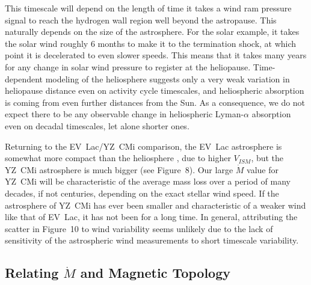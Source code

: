 \documentclass[preprint]{aastex}
\begin{document}
     This timescale will depend on
the length of time it takes a wind ram pressure signal to reach the
hydrogen wall region well beyond the astropause.  This naturally
depends on the size of the astrosphere.  For the solar example,
it takes the solar wind roughly 6 months to make it to the termination
shock, at which point it is decelerated to even slower speeds.  This
means that it takes many years for any change in solar wind
pressure to register at the heliopause.  Time-dependent modeling
of the heliosphere \citep[e.g.,][]{nvp13} suggests only a very
weak variation in heliopause distance even on activity cycle timescales,
and heliospheric absorption is coming from even further distances from
the Sun.  As a consequence, we do not expect there to be any observable
change in heliospheric Lyman-$\alpha$ absorption even on decadal
timescales, let alone shorter ones.

     Returning to the EV~Lac/YZ~CMi comparison, the EV~Lac astrosphere is
somewhat more compact than the heliosphere
\citep{bew05a}, due to higher $V_{ISM}$, but the YZ~CMi astrosphere
is much bigger (see Figure~8).  Our large $\dot{M}$ value for YZ~CMi will be
characteristic of the average mass loss over a period of many decades, if
not centuries, depending on the exact stellar wind speed.  If the
astrosphere of YZ~CMi has ever been smaller and characteristic of a
weaker wind like that of EV~Lac, it has not been for a long time.
In general, attributing the scatter in Figure~10 to wind variability
seems unlikely due to the lack of sensitivity of the astrospheric wind
measurements to short timescale variability.


\subsection{Relating $\dot{M}$ and Magnetic Topology}

\end{document}
